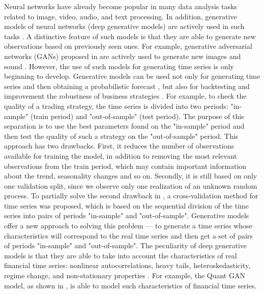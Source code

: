 \documentclass[12pt,a4paper]{article}
\begin{document}
Neural networks have already become popular in many data analysis tasks related to image, video, audio, and text processing. In addition, generative models of neural networks (deep generative models) are actively used in such tasks \cite{introductiondgm2021}. A distinctive feature of such models is that they are able to generate new observations based on previously seen ones. For example, generative adversarial networks (GANs) proposed in \cite{goodfellow2014} are actively used to generate new images \cite{choi2018stargan} and sound \cite{oord2016wavenet}. However, the use of such models for generating time series is only beginning to develop. Generative models can be used not only for generating time series and then obtaining a probabilistic forecast \cite{koochali2020like}, but also for backtesting and improvement the robustness of business strategies \cite{lezmi2020improving}. For example, to check the quality of a trading strategy, the time series is divided into two periods: "in-sample" (train period) and "out-of-sample" (test period). The purpose of this separation is to use the best parameters found on the "in-sample" period and then test the quality of such a strategy on the "out-of-sample" period. This approach has two drawbacks. First, it reduces the number of observations available for training the model, in addition to removing the most relevant observations from the train period, which may contain important information about the trend, seasonality changes and so on. Secondly, it is still based on only one validation split, since we observe only one realization of an unknown random process. To partially solve the second drawback in \cite{fpp3}, a cross-validation method for time series was proposed, which is based on the sequential division of the time series into pairs of periods "in-sample" and "out-of-sample". Generative models offer a new approach to solving this problem — to generate a time series whose characteristics will correspond to the real time series and then get a set of pairs of periods "in-sample" and "out-of-sample". The peculiarity of deep generative models is that they are able to take into account the characteristics of real financial time series: nonlinear autocorrelations, heavy tails, heteroskedasticity, regime change, and non-stationary properties \cite{lezmi2020improving}. For example, the Quant GAN model, as shown in \cite{quantgan2020}, is able to model such characteristics of financial time series.
\end{document}

